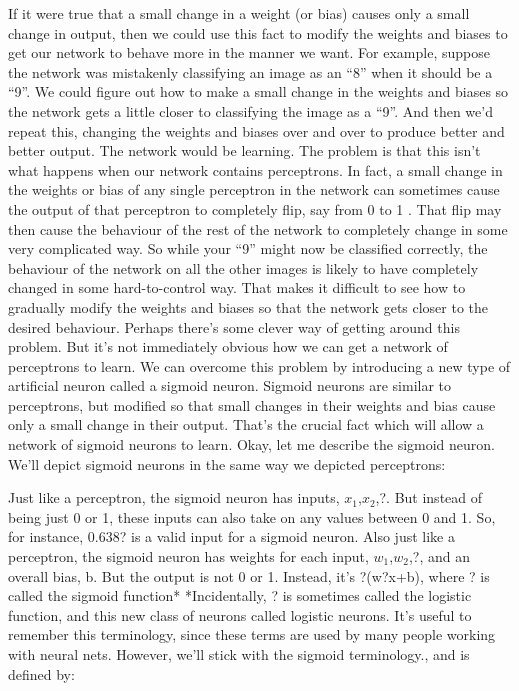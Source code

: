 If it were true that a small change in a weight (or bias) causes only a small change in output, then we could use this fact to modify the weights and biases to get our network to behave more in the manner we want. For example, suppose the network was mistakenly classifying an image as an ``8'' when it should be a ``9''. We could figure out how to make a small change in the weights and biases so the network gets a little closer to classifying the image as a ``9''. And then we'd repeat this, changing the weights and biases over and over to produce better and better output. The network would be learning.
The problem is that this isn't what happens when our network contains perceptrons. In fact, a small change in the weights or bias of any single perceptron in the network can sometimes cause the output of that perceptron to completely flip, say from 0 to 1
. That flip may then cause the behaviour of the rest of the network to completely change in some very complicated way. So while your ``9'' might now be classified correctly, the behaviour of the network on all the other images is likely to have completely changed in some hard-to-control way. That makes it difficult to see how to gradually modify the weights and biases so that the network gets closer to the desired behaviour. Perhaps there's some clever way of getting around this problem. But it's not immediately obvious how we can get a network of perceptrons to learn.
We can overcome this problem by introducing a new type of artificial neuron called a sigmoid neuron. Sigmoid neurons are similar to perceptrons, but modified so that small changes in their weights and bias cause only a small change in their output. That's the crucial fact which will allow a network of sigmoid neurons to learn.
Okay, let me describe the sigmoid neuron. We'll depict sigmoid neurons in the same way we depicted perceptrons: 

Just like a perceptron, the sigmoid neuron has inputs, $x_1$,$x_2$,?. But instead of being just 0 or 1, these inputs can also take on any values between 0 and 1. So, for instance, 0.638? is a valid input for a sigmoid neuron. Also just like a perceptron, the sigmoid neuron has weights for each input, $w_1$,$w_2$,?, and an overall bias, b. But the output is not 0 or 1. Instead, it's ?(w?x+b), where ? is called the sigmoid function* *Incidentally, ? is sometimes called the logistic function, and this new class of neurons called logistic neurons. It's useful to remember this terminology, since these terms are used by many people working with neural nets. However, we'll stick with the sigmoid terminology., and is defined by: 



